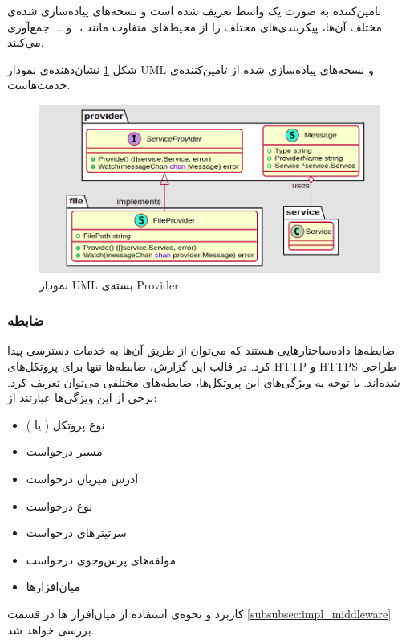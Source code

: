 تامین‌کننده به صورت یک واسط تعریف شده است و نسخه‌های پیاده‌سازی شده‌ی مختلف ‌آن‌ها، پیکربندی‌های مختلف را از محیط‌های متفاوت مانند ، ‌ و ... جمع‌آوری می‌کنند.

شکل
\ref{provider}
نشان‌دهنده‌ی نمودار UML و نسخه‌های پیاده‌سازی شده از تامین‌کننده‌ی خدمت‌هاست.

\begin{figure}[H]
    \centering
    \caption{نمودار UML بسته‌ی Provider}
    \label{provider}
    \includegraphics[scale=0.2]{images/Provider.png}
\end{figure}

\subsubsection{ضابطه}
ضابطه‌ها داده‌ساختار‌هایی هستند که می‌توان از طریق آن‌ها به خدمات دسترسی پیدا کرد. در قالب این گزارش، ضابطه‌ها تنها برای پروتکل‌های HTTP و HTTPS طراحی شده‌اند. با توجه به ویژگی‌های این پروتکل‌ها، ضابطه‌های مختلفی می‌توان تعریف کرد. برخی از این ویژگی‌ها عبارتند از:

\begin{itemize}
    \item نوع پروتکل ( یا )
    \item مسیر درخواست 
    \item آدرس میزبان درخواست 
    \item نوع درخواست 
    \item سرتیتر‌های درخواست 
    \item مولفه‌های پرس‌و‌جوی درخواست 
    \item میان‌افزار‌ها
\end{itemize}

کاربرد و نحوه‌ی استفاده از میان‌افزار ها در قسمت
\ref{subsubsec:impl_middleware}
بررسی خواهد شد.


